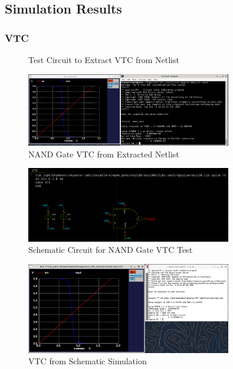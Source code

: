 \documentclass{article}
\begin{document}
	\subsection{Simulation Results}
	
	\subsubsection{VTC}
	\begin{figure}[H]
		
		\caption{Test Circuit to Extract VTC from Netlist}
		\label{fig::nand_vtc_test_circuit}
	\end{figure}
	
	\begin{figure}[H]
		\centerline{\includegraphics[width=0.8\textwidth]{nand_vtc.png}}
		\caption{NAND Gate VTC from Extracted Netlist}
		\label{fig::nand_vtc}
	\end{figure}
	
	\begin{figure}[H]
		\centerline{\includegraphics[width=0.8\textwidth]{nand_vtc_test_circuit.png}}
		\caption{Schematic Circuit for NAND Gate VTC Test}
		\label{fig::nand_vtc_schem_test_circuit}
	\end{figure}
	
	\begin{figure}[H]
		\centerline{\includegraphics[width=0.8\textwidth]{nand_vtc_schem.png}}
		\caption{VTC from Schematic Simulation}
		\label{fig::nand_vtc_schem}
	\end{figure}
	
\end{document}

